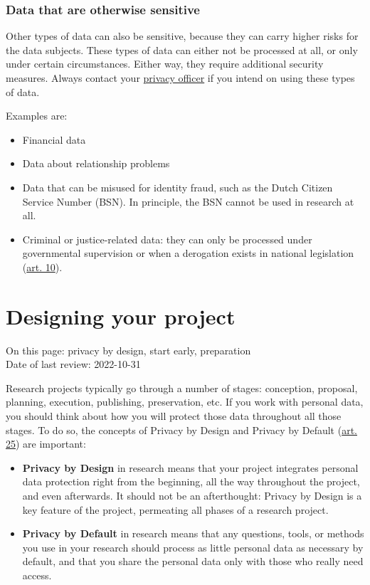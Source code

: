 \documentclass[
]{book}
\providecommand{\tightlist}{%
  \setlength{\itemsep}{0pt}\setlength{\parskip}{0pt}}
\begin{document}
\hypertarget{data-that-are-otherwise-sensitive}{%
\subsection{Data that are otherwise sensitive}\label{data-that-are-otherwise-sensitive}}

Other types of data can also be sensitive, because they can carry higher risks
for the data subjects. These types of data can either not be processed at all,
or only under certain circumstances. Either way, they require additional
security measures. Always contact your \protect\hyperlink{support}{privacy officer}
if you intend on using these types of data.

Examples are:

\begin{itemize}
\tightlist
\item
  Financial data
\item
  Data about relationship problems
\item
  Data that can be misused for identity fraud, such as the Dutch Citizen
  Service Number (BSN). In principle, the BSN cannot be used in research at all.
\item
  Criminal or justice-related data: they can only be processed under
  governmental supervision or when a derogation exists in national legislation
  (\href{https://gdpr-info.eu/art-10-gdpr/}{art. 10}).
\end{itemize}

\hypertarget{privacy-by-design}{%
\chapter{Designing your project}\label{privacy-by-design}}

On this page: privacy by design, start early, preparation\\
Date of last review: 2022-10-31

Research projects typically go through a number of stages: conception, proposal,
planning, execution, publishing, preservation, etc. If you work with personal
data, you should think about how you will protect those data throughout all
those stages. To do so, the concepts of Privacy by Design and Privacy by Default
(\href{https://gdpr-info.eu/art-25-gdpr/}{art. 25}) are
important:

\begin{itemize}
\tightlist
\item
  \textbf{Privacy by Design} in research means that your project integrates personal
  data protection right from the beginning, all the way throughout the project,
  and even afterwards. It should not be an afterthought: Privacy by Design is a
  key feature of the project, permeating all phases of a research project.
\item
  \textbf{Privacy by Default} in research means that any questions, tools, or methods
  you use in your research should process as little personal data as necessary by
  default, and that you share the personal data only with those who really need
  access.
\end{itemize}
\end{document}
